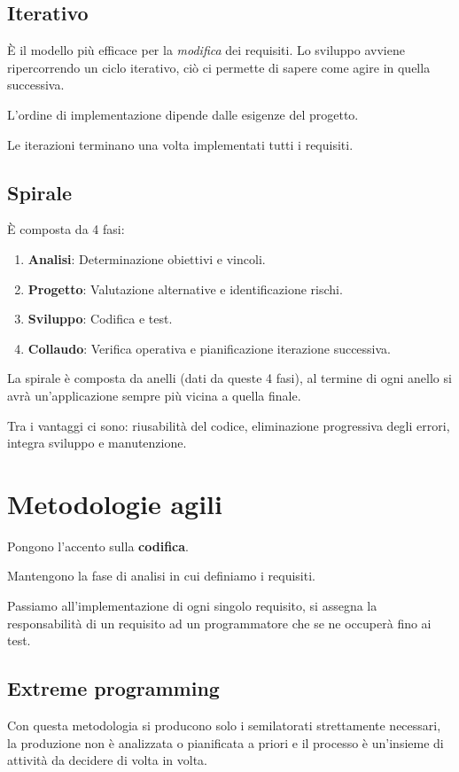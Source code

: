 \documentclass{report}
\begin{document}
\subsection*{Iterativo}
\`E il modello più efficace per la \textit{modifica} dei requisiti. Lo sviluppo avviene ripercorrendo un ciclo iterativo, ciò ci permette di sapere come agire in quella successiva.

\noindent
L'ordine di implementazione dipende dalle esigenze del progetto.

\noindent
Le iterazioni terminano una volta implementati tutti i requisiti.

\subsection*{Spirale}
\`E composta da 4 fasi:
\begin{enumerate}
    \item \textbf{Analisi}: Determinazione obiettivi e vincoli.
    \item \textbf{Progetto}: Valutazione alternative e identificazione rischi.
    \item \textbf{Sviluppo}: Codifica e test.
    \item \textbf{Collaudo}: Verifica operativa e pianificazione iterazione successiva.
\end{enumerate}

\noindent
La spirale è composta da anelli (dati da queste 4 fasi), al termine di ogni anello si avrà un'applicazione sempre più vicina a quella finale.

\noindent
Tra i vantaggi ci sono: riusabilità del codice, eliminazione progressiva degli errori, integra sviluppo e manutenzione.

\newpage
\section{Metodologie agili}
Pongono l'accento sulla \textbf{codifica}.

\noindent
Mantengono la fase di analisi in cui definiamo i requisiti.

\noindent
Passiamo all'implementazione di ogni singolo requisito, si assegna la responsabilità di un requisito ad un programmatore che se ne occuperà fino ai test.

\subsection*{Extreme programming}
Con questa metodologia si producono solo i semilatorati strettamente necessari, la produzione non è analizzata o pianificata a priori e il processo è un'insieme di attività da decidere di volta in volta.
\end{document}
